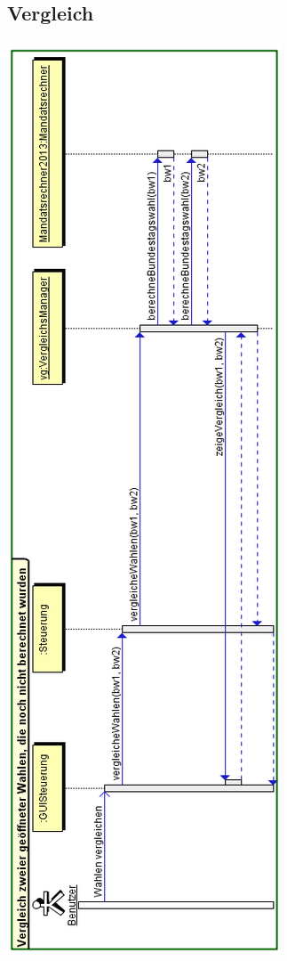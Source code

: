 \documentclass[12pt,a4paper,titlepage]{article}
\begin{document}
\subsection{Vergleich}
\includegraphics[scale=0.75]{Vergleich-Sequenzdiagramm.png} 
\end{document}
